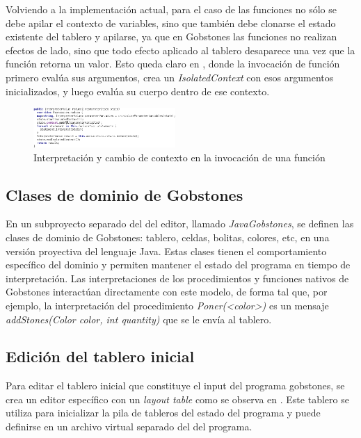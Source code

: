 Volviendo a la implementación actual, para el caso de las funciones no sólo se debe apilar el contexto de variables, sino que también debe clonarse el estado existente del tablero y apilarse, ya que en Gobstones las funciones no realizan efectos de lado, sino que todo efecto aplicado al tablero desaparece una vez que la función retorna un valor. Esto queda claro en , donde la invocación de función primero evalúa sus argumentos, crea un \textit{IsolatedContext} con esos argumentos inicializados, y luego evalúa su cuerpo dentro de ese contexto.

\begin{figure}[hb]
\centering
\includegraphics[width=0.48\textwidth]{assets/behavior_function_invocation}
\caption{Interpretación y cambio de contexto en la invocación de una función}
\label{fig:behavior_function_invocation}
\end{figure}

\subsection{Clases de dominio de Gobstones}

En un subproyecto separado del del editor, llamado \textit{JavaGobstones}, se definen las clases de dominio de Gobstones: tablero, celdas, bolitas, colores, etc, en una versión proyectiva del lenguaje Java. Estas clases tienen el comportamiento específico del dominio y permiten mantener el estado del programa en tiempo de interpretación. Las interpretaciones de los procedimientos y funciones nativos de Gobstones interactúan directamente con este modelo, de forma tal que, por ejemplo, la interpretación del procedimiento \textit{Poner(<color>)} es un mensaje \textit{addStones(Color color, int quantity)} que se le envía al tablero.

\subsection{Edición del tablero inicial}

Para editar el tablero inicial que constituye el input del programa gobstones, se crea un editor específico con un \textit{layout table} como se observa en . Este tablero se utiliza para inicializar la pila de tableros del estado del programa y puede definirse en un archivo virtual separado del del programa. 

